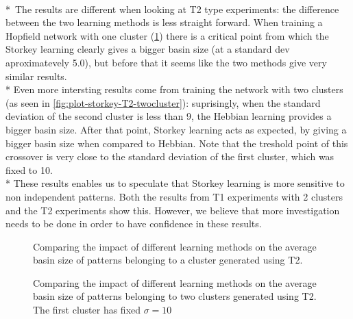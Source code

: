\\*\
The results are different when looking at T2 type experiments:
the difference between the two learning methods is less straight forward.
When training a Hopfield network with one cluster (\ref{fig:plot-storkey-T2-onecluster})  there is a critical point from which the Storkey learning clearly gives a bigger basin size 
(at a standard dev aproximatevely 5.0), but before that it seems like the two methods give very similar results.
\\*
Even more intersting results come from training the network with two clusters (as seen in \ref{fig:plot-storkey-T2-twocluster}): suprisingly, when the standard deviation of the second cluster 
is less than 9, the Hebbian learning provides a bigger basin size. After that point, Storkey learning acts as expected, by giving a 
bigger basin size when compared to Hebbian. Note that the treshold point of this crossover is very close to the standard deviation of the first
cluster, which was fixed to 10. 
\\* These results enables us to speculate that Storkey learning is more sensitive to non independent patterns. Both the results from T1 experiments with
2 clusters and the T2 experiments show this. However, we believe that more investigation needs to be done in order to have confidence in these results.






\begin{figure}[h]
  \centering
  
\caption{Comparing the impact of different learning methods on the average basin size of patterns belonging to a cluster generated using T2.}
\label{fig:plot-storkey-T2-onecluster}
\end{figure}

\begin{figure}[h]
  \centering
  
\caption{Comparing the impact of different learning methods on the average basin size of patterns belonging to two clusters generated using T2. The first cluster has fixed $\sigma = 10$}
\label{fig:plot-storkey-T2-twoclusters}
\end{figure}
